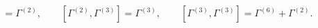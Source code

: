 \begin{equation}
[\Gamma^{(2)},\Gamma^{(2)}]=\Gamma^{(2)},\qquad
[\Gamma^{(2)},\Gamma^{(3)}]=\Gamma^{(3)},\qquad
[\Gamma^{(3)},\Gamma^{(3)}]=\Gamma^{(6)}+\Gamma^{(2)}.
\label{eq:diralg}
\end{equation}

